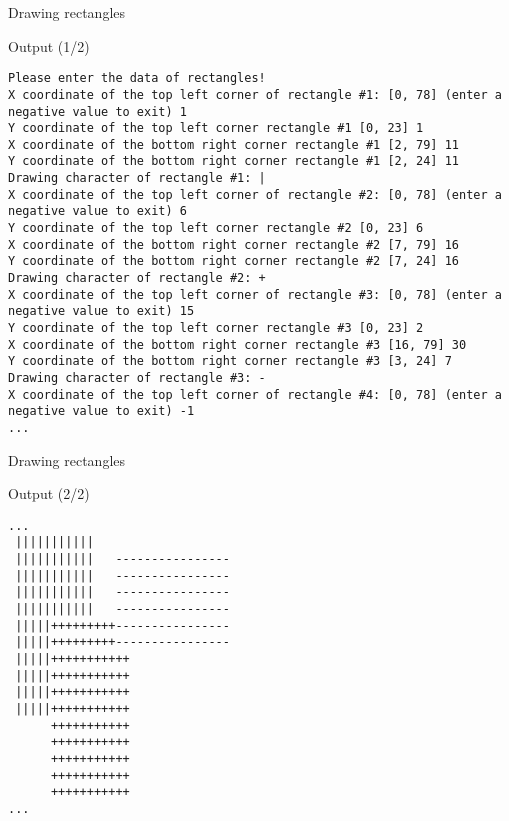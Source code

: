 \documentclass[usenames,dvipsnames,aspectratio=169]{beamer}
\begin{document}
\begin{frame}[fragile]{Drawing rectangles}
  \tiny
  \begin{block}{Output (1/2)}
    \begin{verbatim}
Please enter the data of rectangles!
X coordinate of the top left corner of rectangle #1: [0, 78] (enter a negative value to exit) 1
Y coordinate of the top left corner rectangle #1 [0, 23] 1
X coordinate of the bottom right corner rectangle #1 [2, 79] 11
Y coordinate of the bottom right corner rectangle #1 [2, 24] 11
Drawing character of rectangle #1: |
X coordinate of the top left corner of rectangle #2: [0, 78] (enter a negative value to exit) 6
Y coordinate of the top left corner rectangle #2 [0, 23] 6
X coordinate of the bottom right corner rectangle #2 [7, 79] 16
Y coordinate of the bottom right corner rectangle #2 [7, 24] 16
Drawing character of rectangle #2: +
X coordinate of the top left corner of rectangle #3: [0, 78] (enter a negative value to exit) 15
Y coordinate of the top left corner rectangle #3 [0, 23] 2
X coordinate of the bottom right corner rectangle #3 [16, 79] 30
Y coordinate of the bottom right corner rectangle #3 [3, 24] 7
Drawing character of rectangle #3: -
X coordinate of the top left corner of rectangle #4: [0, 78] (enter a negative value to exit) -1
...
\end{verbatim}
  \end{block}
\end{frame}

\begin{frame}[fragile]{Drawing rectangles}
  \footnotesize
  \begin{block}{Output (2/2)}
    \begin{verbatim}
...
 |||||||||||                                                                   
 |||||||||||   ----------------                                                
 |||||||||||   ----------------                                                
 |||||||||||   ----------------                                                
 |||||||||||   ----------------                                                
 |||||+++++++++----------------                                                
 |||||+++++++++----------------                                                
 |||||+++++++++++                                                              
 |||||+++++++++++                                                              
 |||||+++++++++++                                                              
 |||||+++++++++++                                                              
      +++++++++++                                                              
      +++++++++++                                                              
      +++++++++++                                                              
      +++++++++++                                                              
      +++++++++++
...
\end{verbatim}
  \end{block}
\end{frame}
\end{document}
